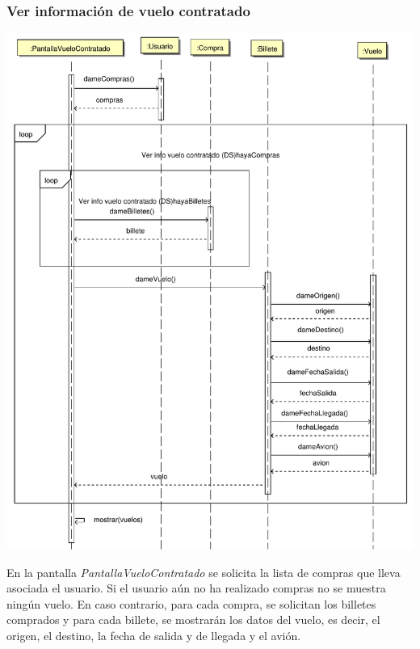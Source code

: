 \documentclass[11pt, a4paper, twoside, titlepage]{article}
\begin{document}
			\subsubsection{Ver información de vuelo contratado}
				\begin{center}
					\includegraphics[scale=.7]{diseno/diagramas/verinfovuelocontratado.pdf}
				\end{center}
				
				En la pantalla {\itshape PantallaVueloContratado} se solicita la lista de compras que lleva asociada el usuario. Si el usuario aún no ha realizado compras no se muestra ningún vuelo. En caso contrario, para cada compra, se solicitan los billetes comprados y para cada billete, se mostrarán los datos del vuelo, es decir, el origen, el destino, la fecha de salida y de llegada y el avión.
\end{document}
